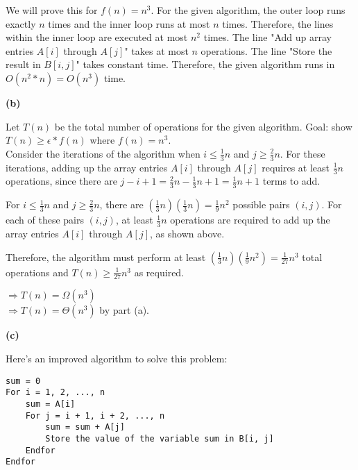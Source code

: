 \documentclass[11pt]{article}
\renewcommand\part[1]{\vspace{.10in}\textbf{(#1)}}
\begin{document}
We will prove this for $f(n) = n^3$. For the given algorithm, the outer loop runs exactly $n$ times and the inner loop runs at most $n$ times.
Therefore, the lines within the inner loop are executed at most $n^2$ times. The line "Add up array entries $A[i]$ through $A[j]$" takes at most $n$ operations.
The line "Store the result in $B[i, j]$" takes constant time. Therefore, the given algorithm runs in $O(n^2 * n) = O(n^3)$ time.

\part{b}

Let $T(n)$ be the total number of operations for the given algorithm. Goal: show $T(n) \geq \epsilon * f(n)$ where $f(n) = n^3$.\\

Consider the iterations of the algorithm when $i \leq \frac{1}{3}n$ and $j \geq \frac{2}{3}n$. For these iterations, adding up the array entries $A[i]$ through $A[j]$ requires at least $\frac{1}{3}n$ operations, since there are $j - i + 1 = \frac{2}{3}n - \frac{1}{3}n + 1 = \frac{1}{3}n + 1$ terms to add.

For $i \leq \frac{1}{3}n$ and $j \geq \frac{2}{3}n$, there are $( \frac{1}{3}n )( \frac{1}{3}n ) = \frac{1}{9}n^2$ possible pairs $(i, j)$. For each of these pairs $(i, j)$, at least $\frac{1}{3}n$ operations are required to add up the array entries $A[i]$ through $A[j]$, as shown above.

Therefore, the algorithm must perform at least $( \frac{1}{3}n )( \frac{1}{9}n^2 ) = \frac{1}{27}n^3$ total operations and $T(n) \geq \frac{1}{27}n^3$ as required.

$\Rightarrow T(n) = \Omega(n^3)$\\
$\Rightarrow T(n) = \Theta(n^3)$ by part (a).

\part{c}

Here's an improved algorithm to solve this problem:\\

\begin{verbatim}
sum = 0
For i = 1, 2, ..., n
    sum = A[i]
    For j = i + 1, i + 2, ..., n
        sum = sum + A[j]
        Store the value of the variable sum in B[i, j]
    Endfor
Endfor
\end{verbatim}
\end{document}
